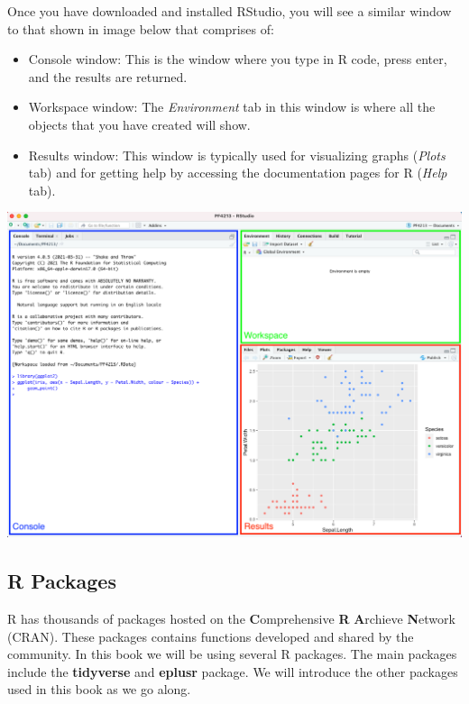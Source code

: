 \documentclass[
]{book}
\begin{document}
Once you have downloaded and installed RStudio, you will see a similar window to that shown in image below that comprises of:

\begin{itemize}
\item
  Console window: This is the window where you type in R code, press enter, and the results are returned.
\item
  Workspace window: The \emph{Environment} tab in this window is where all the objects that you have created will show.
\item
  Results window: This window is typically used for visualizing graphs (\emph{Plots} tab) and for getting help by accessing the documentation pages for R (\emph{Help} tab).
\end{itemize}

\begin{center}\includegraphics[width=1\linewidth]{figures/rstudio_console} \end{center}

\hypertarget{r-packages}{%
\subsection*{R Packages}\label{r-packages}}

R has thousands of packages hosted on the \textbf{C}omprehensive \textbf{R} \textbf{A}rchieve \textbf{N}etwork (CRAN). These packages contains functions developed and shared by the community. In this book we will be using several R packages. The main packages include the \textbf{tidyverse} and \textbf{eplusr} package. We will introduce the other packages used in this book as we go along.
\end{document}
